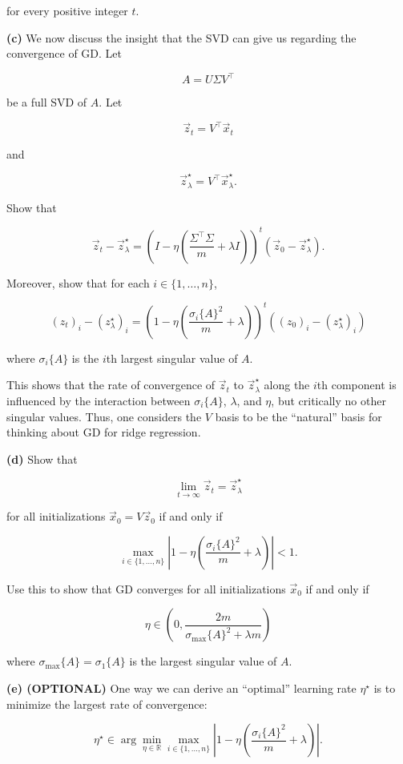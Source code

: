 \documentclass[
  12pt,
]{fphw}
\begin{document}
for every positive integer $t$.

\textbf{(c)}
We now discuss the insight that the SVD can give us regarding the convergence of GD. Let

\[
A = U\Sigma V^\top
\]

be a full SVD of $A$. Let

\[
\vec{z}_t = V^\top \vec{x}_t
\]

and

\[
\vec{z}_\lambda^\star = V^\top \vec{x}_\lambda^\star.
\]

Show that

\[
\vec{z}_t - \vec{z}_\lambda^\star
=
\left(
I - \eta \left( \frac{\Sigma^\top\Sigma}{m} + \lambda I \right) \right)^t (\vec{z}_0-\vec{z}_\lambda^\star).  \tag{6}
\]

Moreover, show that for each $i \in \{1,\dots,n\}$,

\[
(z_t)_i - (z_\lambda^\star)_i = \left( 1-\eta\left(\frac{\sigma_i\{A\}^2}{m}+\lambda\right) \right)^t
\left((z_0)_i-(z_\lambda^\star)_i\right) \tag{7}
\]

where $\sigma_i\{A\}$ is the $i$th largest singular value of $A$.

This shows that the rate of convergence of $\vec{z}_t$ to $\vec{z}_\lambda^\star$ along the $i$th component is influenced by the interaction between $\sigma_i\{A\}$, $\lambda$, and $\eta$, but critically no other singular values. Thus, one considers the $V$ basis to be the “natural” basis for thinking about GD for ridge regression.

\textbf{(d)}
Show that

\[
\lim_{t\to\infty} \vec{z}_t = \vec{z}_\lambda^\star
\]

for all initializations $\vec{x}_0 = V\vec{z}_0$ if and only if

\[
\max_{i\in\{1,\dots,n\}}
\left|
1-\eta\left(\frac{\sigma_i\{A\}^2}{m}+\lambda\right)
\right| < 1.
\tag{8}
\]

Use this to show that GD converges for all initializations $\vec{x}_0$ if and only if

\[
\eta
\in
\left(
0,
\frac{2m}{\sigma_{\max}\{A\}^2+\lambda m}
\right)
\tag{9}
\]

where $\sigma_{\max}\{A\}=\sigma_1\{A\}$ is the largest singular value of $A$.

\textbf{(e) (OPTIONAL)}
One way we can derive an “optimal” learning rate $\eta^\star$ is to minimize the largest rate of convergence:

\[
\eta^\star \in \arg\min_{\eta\in\mathbb{R}} \max_{i\in\{1,\dots,n\}} \left| 1-\eta \left( \frac{\sigma_i\{A\}^2}{m}+\lambda \right) \right|.  \tag{10}
\]
\end{document}
